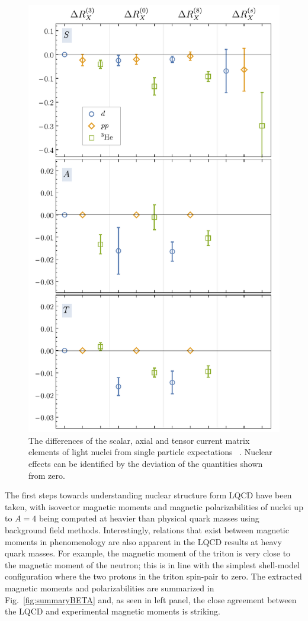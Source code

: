 %
\begin{figure}
	\vspace*{-0cm}
	\centering
	\includegraphics[width=0.4\columnwidth]{figures/RatioSummary.pdf}  
	\caption{ 
		The differences of the scalar, axial and tensor current matrix elements of light nuclei from single particle expectations ~\protect\cite{Chang:2017eiq}. Nuclear effects can be identified by the deviation of the quantities shown from zero.   
	}
	\label{fig:SAT}
	\vspace*{-0.5cm}
\end{figure}
%
The first steps towards understanding nuclear structure form LQCD have been taken, with isovector magnetic moments \cite{Beane:2014ora,Beane:2015yha,Detmold:2015daa} and magnetic  polarizabilities \cite{Chang:2015qxa} of nuclei up to $A=4$ being computed at heavier than physical quark masses using background field methods. Interestingly, relations that exist between magnetic moments in phenomenology are also apparent in the LQCD results at heavy quark masses. For example,  the magnetic moment of the triton is very close to the magnetic moment of the neutron; this is in line with the simplest shell-model configuration where the two protons in the triton spin-pair to zero. The extracted magnetic moments and polarizabilities are summarized in Fig.~\ref{fig:summaryBETA} and, as seen in left panel, the close agreement between the LQCD  and experimental magnetic moments is striking.

